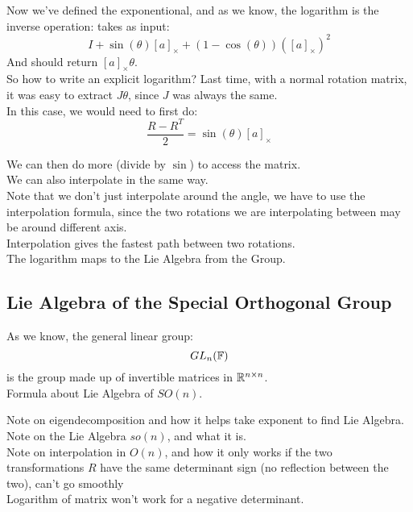\documentclass[12pt]{article}
\begin{document}
Now we've defined the exponentional,
and as we know, the logarithm is the inverse
operation: takes as input:
\[ I + \sin(\theta)[a]_\times 
+ (1-\cos(\theta))([a]_\times)^2 \]
And should return $[a]_\times\theta$. \\

So how to write an explicit logarithm?
Last time, with a normal rotation matrix,
it was easy to extract $J\theta$,
since $J$ was always the same. \\

In this case, we would need to first do:
\[ \dfrac{R - R^T}{2} = \sin(\theta)[a]_\times \]

We can then do more (divide by $\sin$)
to access the matrix. \\

We can also interpolate in the same way. \\
Note that we don't just interpolate around
the angle, we have to use the interpolation
formula, since the two rotations we are
interpolating between may be around different
axis. \\

Interpolation gives the fastest path
between two rotations. \\

The logarithm maps to the Lie Algebra from the
Group.

\newpage

\subsection*{Lie Algebra of the Special
Orthogonal Group}

As we know, the general linear group:
\[ GL_n(\mathbb{F}) \]
is the group made up of invertible
matrices in $\mathbb{R}^{n \times n}$. \\

Formula about Lie Algebra of $SO(n)$.

Note on eigendecomposition and how it helps
take exponent to find Lie Algebra. \\

Note on the Lie Algebra $so(n)$,
and what it is. \\

Note on interpolation in $O(n)$,
and how it only works if the two
transformations $R$ have the same determinant
sign (no reflection between the two),
can't go smoothly \\
Logarithm of matrix won't work for
a negative determinant. \\
\end{document}
